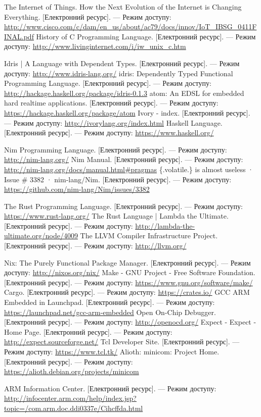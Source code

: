 \documentclass[oneside,14pt,a4paper,final]{myextreport}
\newcommand{\eresource}[2]{#1. [Електронний ресурс]. --- Режим доступу: \url{#2}}
\begin{document}
\begin{thebibliography}{00}
    \eresource{The Internet of Things. How the Next Evolution of the Internet is Changing Everything}{http://www.cisco.com/c/dam/en\_us/about/ac79/docs/innov/IoT\_IBSG\_0411FINAL.pdf}
    \eresource{History of C Programming Language}{http://www.livinginternet.com/i/iw\_unix\_c.htm}

    \eresource{Idris | A Language with Dependent Types}{http://www.idris-lang.org/}
    \eresource{idris: Dependently Typed Functional Programming Language}{http://hackage.haskell.org/package/idris-0.1.3}
    \eresource{atom: An EDSL for embedded hard realtime applications}{https://hackage.haskell.org/package/atom}
    \eresource{Ivory - index}{http://ivorylang.org/index.html}
    \eresource{Haskell Language}{https://www.haskell.org/}

    \eresource{Nim Programming Language}{http://nim-lang.org/}
    \eresource{Nim Manual}{http://nim-lang.org/docs/manual.html\#pragmas}
    \eresource{\{.volatile.\} is almost useless · Issue \# 3382 · nim-lang/Nim}{https://github.com/nim-lang/Nim/issues/3382}

    \eresource{The Rust Programming Language}{https://www.rust-lang.org/}
    \eresource{The Rust Language | Lambda the Ultimate}{http://lambda-the-ultimate.org/node/4009}
    \eresource{The LLVM Compiler Infrastructure Project}{http://llvm.org/}

    \eresource{Nix: The Purely Functional Package Manager}{http://nixos.org/nix/}
    \eresource{Make - GNU Project - Free Software Foundation}{https://www.gnu.org/software/make/}
    \eresource{Cargo}{https://crates.io/}
    \eresource{GCC ARM Embedded in Launchpad}{https://launchpad.net/gcc-arm-embedded}
    \eresource{Open On-Chip Debugger}{http://openocd.org/}
    \eresource{Expect - Expect - Home Page}{http://expect.sourceforge.net/}
    \eresource{Tcl Developer Site}{https://www.tcl.tk/}
    \eresource{Alioth: minicom: Project Home}{https://alioth.debian.org/projects/minicom}

    \eresource{ARM Information Center}{http://infocenter.arm.com/help/index.jsp?topic=/com.arm.doc.ddi0337e/Cihcffda.html}

\end{thebibliography}
\end{document}
